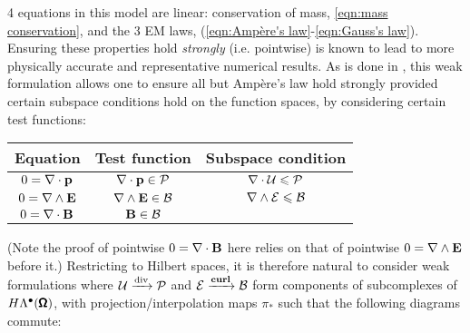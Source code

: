      4 equations in this model are linear: conservation of mass, \ref{eqn:mass conservation}, and the 3 EM laws, (\ref{eqn:Ampère's law}-\ref{eqn:Gauss's law}). Ensuring these properties hold \emph{strongly} (i.e. pointwise) is known to lead to more physically accurate and representative numerical results. \BA{[Ref, ...]}  As is done in \cite{LFM22}, this weak formulation allows one to ensure all but Ampère's law hold strongly provided certain subspace conditions hold on the function spaces, by considering certain test functions: 
    \begin{center}\begin{tabular}{ c | c | c }
        Equation  &  Test function  &  Subspace condition  \\
        \hline\hline
        $0  =  \nabla\cdot\mathbf{p}$  &  $\nabla\cdot\mathbf{p}  \in  \mathcal{P}$  &  $\nabla\cdot\mathcal{U}  \leqslant  \mathcal{P}$  \\
        $0  =  \nabla\wedge\mathbf{E}$  &  $\nabla\wedge\mathbf{E}  \in  \mathcal{B}$  &  $\nabla\wedge\mathcal{E}  \leqslant  \mathcal{B}$  \\
        $0  =  \nabla\cdot\mathbf{B}$  &  $\mathbf{B}  \in  \mathcal{B}$  &
    \end{tabular}\end{center}
    (Note the proof of pointwise $0  =  \nabla\cdot\mathbf{B}$ here relies on that of pointwise $0  =  \nabla\wedge\mathbf{E}$ before it.) Restricting to Hilbert spaces, it is therefore natural to consider weak formulations where $\mathcal{U} \xrightarrow{\mathrm{div}} \mathcal{P}$ and $\mathcal{E} \xrightarrow{\mathbf{curl}} \mathcal{B}$ form components of subcomplexes of $H\Lambda^{\bullet}(\pmb{\mathsf{\Omega}})$, with projection/interpolation maps $\pi_{*}$ such that the following diagrams commute:
    \begin{center}\end{center}

